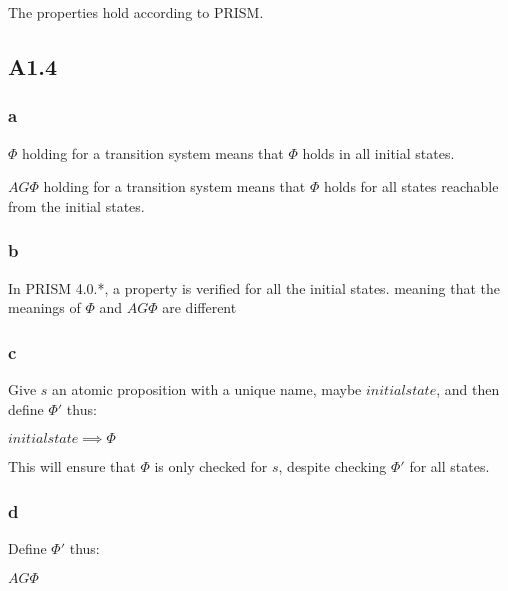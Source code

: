 The properties hold according to PRISM.

\subsection{A1.4}

\subsubsection{a}

$\Phi$ holding for a transition system means that $\Phi$ holds
in all initial states.

$AG \Phi$ holding for a transition system means that $\Phi$ holds
for all states reachable from the initial states.

\subsubsection{b}

In PRISM 4.0.*, a property is verified for all the initial states.
meaning that the meanings of $\Phi$ and $AG \Phi$ are different

\subsubsection{c}

Give $s$ an atomic proposition with a unique name,
maybe $initialstate$, and then define $\Phi '$ thus:

$initialstate \implies \Phi$

This will ensure that $\Phi$ is only checked for $s$,
despite checking $\Phi '$ for all states.

\subsubsection{d}

Define $\Phi '$ thus:

$AG \Phi$

